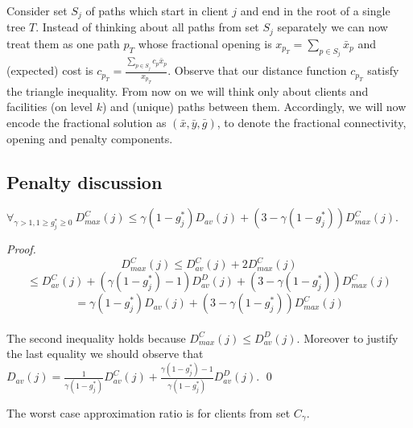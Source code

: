 \documentclass{llncs}
\begin{document}
Consider set $S_j$ of paths which start in client $j$ and end in the root of a single tree $T$. Instead of thinking about all paths from set $S_j$ separately we can now treat them as one path $p_T$ whose fractional opening is $x_{p_T} = \sum_{p \in S_j} \bar{x}_p$
and (expected) cost is $c_{p_T} = \frac{\sum_{p \in S_j} c_p \bar{x}_p}{x_{p_T}}$. Observe that our distance function $c_{p_T}$ satisfy the triangle inequality. From now on we will think only about clients and facilities (on level $k$) and (unique) paths between them. Accordingly, we will now encode the fractional solution as $(\bar{x}, \bar{y}, \bar{g})$, to denote the fractional connectivity, opening and penalty components.

\subsection{Penalty discussion}
\begin{lemma}
 \label{ineq_proof}
 {$\forall_{\gamma>1, 1 \geq g_j^* \geq 0}~D_{max}^C(j) \leq \gamma (1-g_j^*) D_{av}(j) + (3 - \gamma (1 - g_j^*)) D_{max}^C(j)$.}
\end{lemma}

\begin{proof}
 $$D_{max}^C(j) \leq D_{av}^C(j) + 2 D_{max}^C(j) $$ $$ \leq D_{av}^C(j) + (\gamma (1-g_j^*) - 1) D_{av}^D(j) + (3-\gamma (1-g_j^*)) D_{max}^C(j) $$ $$= \gamma (1-g_j^*) D_{av}(j) + (3 - \gamma (1-g_j^*)) D_{max}^C(j)$$
 \\The second inequality holds because $D_{max}^C(j) \leq D_{av}^D(j)$. Moreover to justify the last equality we should observe that $D_{av}(j) = \frac{1}{\gamma(1-g_j^*)}D_{av}^C(j) + \frac{\gamma(1-g_j^*) - 1}{\gamma(1-g_j^*)} D_{av}^D(j)$.
 \qed
\end{proof}

\begin{lemma}
 \label{worst_case}
 The worst case approximation ratio is for clients from set $C_{\gamma}$.
\end{lemma}
\end{document}
